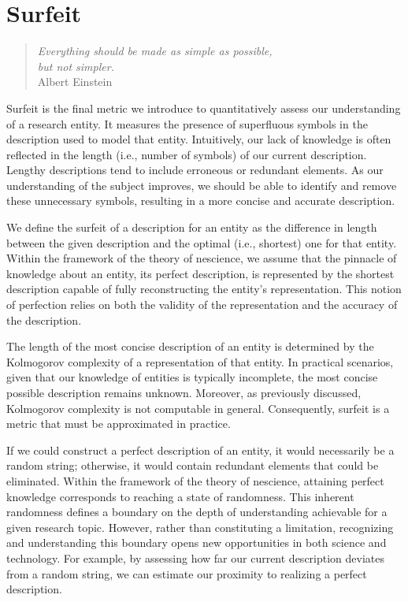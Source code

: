 %
%


\chapter{Surfeit}
\label{chap:Redundancy}

\begin{quote}
\begin{flushright}
\emph{Everything should be made as simple as possible,\\
but not simpler.}\\
Albert Einstein 
\end{flushright}
\end{quote}
\bigskip

Surfeit is the final metric we introduce to quantitatively assess our understanding of a research entity. It measures the presence of superfluous symbols in the description used to model that entity. Intuitively, our lack of knowledge is often reflected in the length (i.e., number of symbols) of our current description. Lengthy descriptions tend to include erroneous or redundant elements. As our understanding of the subject improves, we should be able to identify and remove these unnecessary symbols, resulting in a more concise and accurate description.

We define the surfeit of a description for an entity as the difference in length between the given description and the optimal (i.e., shortest) one for that entity. Within the framework of the theory of nescience, we assume that the pinnacle of knowledge about an entity, its perfect description, is represented by the shortest description capable of fully reconstructing the entity's representation. This notion of perfection relies on both the validity of the representation and the accuracy of the description.

The length of the most concise description of an entity is determined by the Kolmogorov complexity of a representation of that entity. In practical scenarios, given that our knowledge of entities is typically incomplete, the most concise possible description remains unknown. Moreover, as previously discussed, Kolmogorov complexity is not computable in general. Consequently, surfeit is a metric that must be approximated in practice.

If we could construct a perfect description of an entity, it would necessarily be a random string; otherwise, it would contain redundant elements that could be eliminated. Within the framework of the theory of nescience, attaining perfect knowledge corresponds to reaching a state of randomness. This inherent randomness defines a boundary on the depth of understanding achievable for a given research topic. However, rather than constituting a limitation, recognizing and understanding this boundary opens new opportunities in both science and technology. For example, by assessing how far our current description deviates from a random string, we can estimate our proximity to realizing a perfect description.

